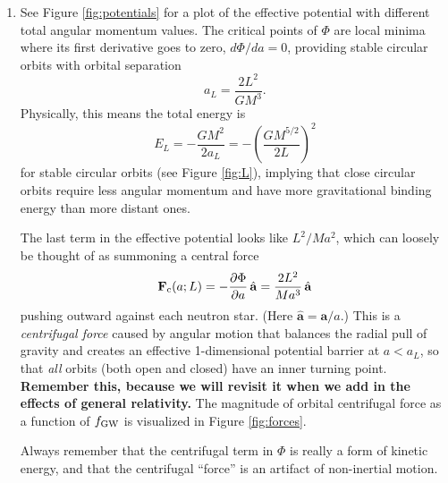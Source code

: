 \documentclass[11pt]{article}
\begin{document}
\begin{enumerate}
\item See Figure \ref{fig:potentials} for a plot of the effective potential with different total angular momentum values. The critical points of $\Phi$ are local minima where its first derivative goes to zero, $d\Phi/da = 0$, providing stable circular orbits with orbital separation
\begin{equation}\label{eq:aL}
a_L = \frac{2L^2}{GM^3}.
\end{equation}
Physically, this means the total energy is
\begin{equation}\label{eq:energy}
E_L = -\frac{GM^2}{2a_L} = - \left( \frac{GM^{5/2}}{2L} \right)^2
\end{equation} for stable circular orbits (see Figure \ref{fig:L}), implying that close circular orbits require less angular momentum and have more gravitational binding energy than more distant ones.

\hspace{15pt} The last term in the effective potential looks like $L^2/Ma^2$, which can loosely be thought of as summoning a central force
\begin{equation}
\mathbf{F}_{\rm c}(a; L) = -\frac{\partial\Phi}{\partial a} \, \hat{\mathbf{a}} = \frac{2L^2}{Ma^3} \, \hat{\mathbf{a}}
\end{equation}
pushing outward against each neutron star. (Here $\hat{\mathbf{a}} = \mathbf{a}/a$.) This is a \textit{centrifugal force} caused by angular motion that balances the radial pull of gravity and creates an effective 1-dimensional potential barrier at $a < a_L$, so that \emph{all} orbits (both open and closed) have an inner turning point. \textbf{Remember this, because we will revisit it when we add in the effects of general relativity.} The magnitude of orbital centrifugal force as a function of $f_{\rm GW}$ is visualized in Figure \ref{fig:forces}.

\hspace{15pt} Always remember that the centrifugal term in $\Phi$ is really a form of kinetic energy, and that the centrifugal ``force'' is an artifact of non-inertial motion.


\end{enumerate}
\end{document}
